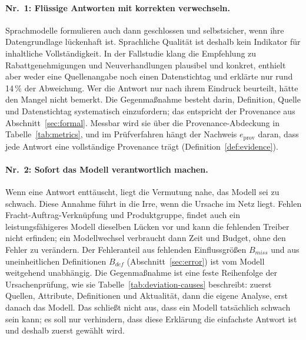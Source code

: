 \documentclass[a4paper,12pt]{article}
\theoremstyle{definition}
\begin{document}
\paragraph{Nr.~1: Flüssige Antworten mit korrekten verwechseln.}
Sprachmodelle formulieren auch dann geschlossen und selbstsicher, wenn ihre Datengrundlage lückenhaft ist. Sprachliche Qualität ist deshalb kein Indikator für inhaltliche Vollständigkeit. In der Fallstudie klang die Empfehlung zu Rabattgenehmigungen und Neuverhandlungen plausibel und konkret, enthielt aber weder eine Quellenangabe noch einen Datenstichtag und erklärte nur rund 14\,\% der Abweichung. Wer die Antwort nur nach ihrem Eindruck beurteilt, hätte den Mangel nicht bemerkt. Die Gegenmaßnahme besteht darin, Definition, Quelle und Datenstichtag systematisch einzufordern; das entspricht der Provenance aus Abschnitt~\ref{sec:formal}. Messbar wird sie über die Provenance-Abdeckung in Tabelle~\ref{tab:metrics}, und im Prüfverfahren hängt der Nachweis $e_{\mathrm{prov}}$ daran, dass jede Antwort eine vollständige Provenance trägt (Definition~\ref{def:evidence}).

\paragraph{Nr.~2: Sofort das Modell verantwortlich machen.}
Wenn eine Antwort enttäuscht, liegt die Vermutung nahe, das Modell sei zu schwach. Diese Annahme führt in die Irre, wenn die Ursache im Netz liegt. Fehlen Fracht-Auftrag-Verknüpfung und Produktgruppe, findet auch ein leistungsfähigeres Modell dieselben Lücken vor und kann die fehlenden Treiber nicht erfinden; ein Modellwechsel verbraucht dann Zeit und Budget, ohne den Fehler zu verändern. Der Fehleranteil aus fehlenden Einflussgrößen $B_{miss}$ und aus uneinheitlichen Definitionen $B_{def}$ (Abschnitt~\ref{sec:error}) ist vom Modell weitgehend unabhängig. Die Gegenmaßnahme ist eine feste Reihenfolge der Ursachenprüfung, wie sie Tabelle~\ref{tab:deviation-causes} beschreibt: zuerst Quellen, Attribute, Definitionen und Aktualität, dann die eigene Analyse, erst danach das Modell. Das schließt nicht aus, dass ein Modell tatsächlich schwach sein kann; es soll nur verhindern, dass diese Erklärung die einfachste Antwort ist und deshalb zuerst gewählt wird.
\end{document}
